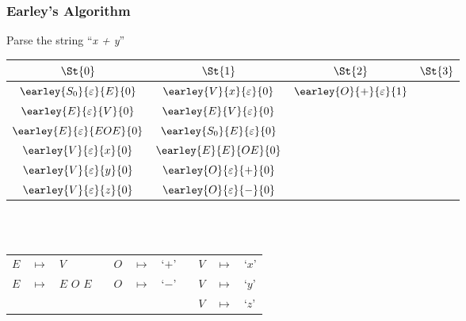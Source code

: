 \begin{frame}
	\frametitle{Earley's Algorithm}
	\centering
	Parse the string ``\emph{x + y}''\\
	\vspace{0.5cm}
	\begin{tabular}{|c|c|c|c|}
		\hline
		$\St{0}$                          & $\St{1}$                          &$\St{2}$ & $\St{3}$ \\
		\hline
		$\earley{S_0}{\varepsilon}{E}{0}$ & $\earley{V}{x}{\varepsilon}{0}$   & $\earley{O}{+}{\varepsilon}{1}$ & \\
		$\earley{E}{\varepsilon}{V}{0}$   & $\earley{E}{V}{\varepsilon}{0}$   & & \\
		$\earley{E}{\varepsilon}{EOE}{0}$ & $\earley{S_0}{E}{\varepsilon}{0}$ & & \\
		$\earley{V}{\varepsilon}{x}{0}$   & $\earley{E}{E}{OE}{0}$            & & \\
		$\earley{V}{\varepsilon}{y}{0}$   & $\earley{O}{\varepsilon}{+}{0}$   & & \\
		$\earley{V}{\varepsilon}{z}{0}$   & $\earley{O}{\varepsilon}{-}{0}$   & & \\
		\hline
	\end{tabular}

	\\~\\
	\vspace{0.5cm}
	\scriptsize
	\begin{tabular}{rclcrclcrcl}
		$E$ & $ \mapsto $ & $V$         && $O$ & $ \mapsto $ & `$+$' && $V$ & $ \mapsto $ & `$x$' \\
		$E$ & $ \mapsto $ & $E$ $O$ $E$ && $O$ & $ \mapsto $ & `$-$' && $V$ & $ \mapsto $ & `$y$' \\
		    &             &             &&     &             &       && $V$ & $ \mapsto $ & `$z$'
	\end{tabular}
\end{frame}

